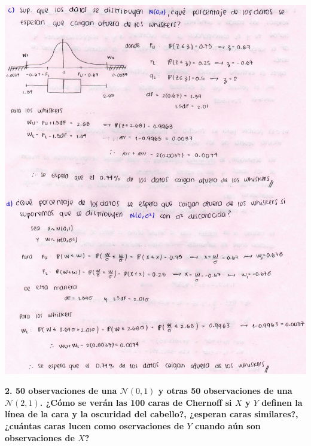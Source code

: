 \documentclass[
]{article}
\begin{document}
\includegraphics{1b.jpg}

\textbf{2. 50 observaciones de una \(\mathcal{N}(0,1)\) y otras 50
observaciones de una \(\mathcal{N}(2,1)\). ¿Cómo se verán las 100 caras
de Chernoff si \(X\) y \(Y\) definen la línea de la cara y la oscuridad
del cabello?, ¿esperan caras similares?, ¿cuántas caras lucen como
oservaciones de \(Y\) cuando aún son observaciones de \(X\)?}
\end{document}
